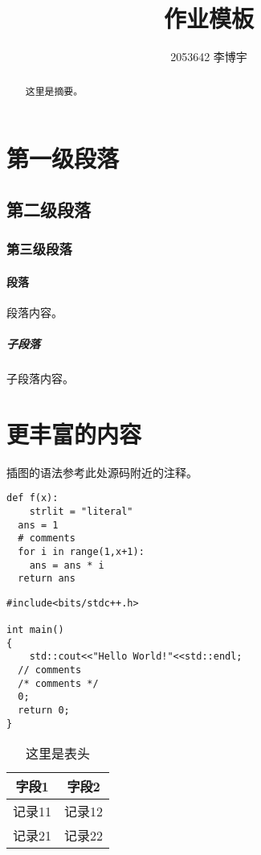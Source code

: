 \documentclass[lang=cn,9pt,a4paper,cite=authoryear]{lewisthesis}
\title{作业模板}
\author{2053642 李博宇}
\institute{计算机科学与技术}
\date{\zhtoday}
\newcommand{\lil}[1]{\lstinline{#1}}
\begin{document}
\maketitle

\begin{abstract}
这里是摘要。
\end{abstract}

\tableofcontents

\newpage

\section{第一级段落}

\subsection{第二级段落}

\subsubsection{第三级段落}

\paragraph{段落}

段落内容。

\subparagraph{子段落}

子段落内容。

\section{更丰富的内容}

插图的语法参考此处源码附近的注释。

\begin{lstlisting}[style=lstypy,caption={这是一段\lil{Python}代码}]
def f(x):
	strlit = "literal"
  ans = 1
  # comments
  for i in range(1,x+1):
    ans = ans * i
  return ans
\end{lstlisting}

\begin{multicols}{2}
\begin{lstlisting}[style=lstycxx,caption={这是一段分栏\lil{C/C++}代码}]
#include<bits/stdc++.h>

int main()
{
	std::cout<<"Hello World!"<<std::endl;
  // comments
  /* comments */
  0;
  return 0;
}
\end{lstlisting}
\end{multicols}

\begin{table}[H]
\centering
\caption{这里是表头}
\begin{tabular}{cc}
\hline
字段1 & 字段2 \\
\hline
记录11 & 记录12 \\
记录21 & 记录22 \\
\hline
\end{tabular}
\end{table}
\end{document}
